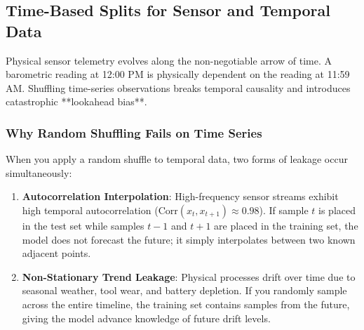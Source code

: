 \subsection{Time-Based Splits for Sensor and Temporal Data}\label{subsec:time_based_splits}

Physical sensor telemetry evolves along the non-negotiable arrow of time. A barometric reading at 12:00 PM is physically dependent on the reading at 11:59 AM. Shuffling time-series observations breaks temporal causality and introduces catastrophic **lookahead bias**.

\subsubsection{Why Random Shuffling Fails on Time Series}
When you apply a random shuffle to temporal data, two forms of leakage occur simultaneously:
\begin{enumerate}
    \item \textbf{Autocorrelation Interpolation}: High-frequency sensor streams exhibit high temporal autocorrelation ($\text{Corr}(x_t, x_{t+1}) \approx 0.98$). If sample $t$ is placed in the test set while samples $t-1$ and $t+1$ are placed in the training set, the model does not forecast the future; it simply interpolates between two known adjacent points.
    \item \textbf{Non-Stationary Trend Leakage}: Physical processes drift over time due to seasonal weather, tool wear, and battery depletion. If you randomly sample across the entire timeline, the training set contains samples from the future, giving the model advance knowledge of future drift levels.
\end{enumerate}

